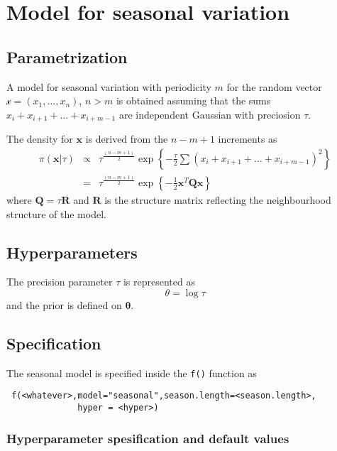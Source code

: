 \documentclass[a4paper,11pt]{article}
\begin{document}
\section*{Model for seasonal variation}

\subsection*{Parametrization}

A model for seasonal variation with periodicity $m$ for the random vector $\mathcal{x}=(x_1,\dots,x_n)$, $n>m$ is obtained assuming that the sums $x_i+x_{i+1}+\dots+x_{i+m-1}$ are independent Gaussian with preciosion $\tau$.

The density for $\mathbf{x}$ is derived from the $n-m+1$ increments as
\begin{eqnarray}
\pi(\mathbf{x}|\tau) &\propto& \tau^{\frac{(n-m+1)}{2}} \exp\left\{-\frac{\tau}{2}\sum (x_i+x_{i+1}+\dots+x_{i+m-1})^2\right\}\\
& = &\tau^{\frac{(n-m+1)}{2}}\exp\left\{-\frac{1}{2}\mathbf{x}^T\mathbf{Q}\mathbf{x} \right\}
\end{eqnarray}
where $\mathbf{Q}=\tau\mathbf{R}$ and $\mathbf{R}$ is the structure matrix reflecting the neighbourhood structure of the model.


\subsection*{Hyperparameters}

The precision parameter $\tau$ is represented as
\begin{displaymath}
    \theta =\log \tau
\end{displaymath}
and the prior is defined on $\mathbf{\theta}$. 

\subsection*{Specification}

The seasonal model is specified inside the {\tt f()} function as
\begin{verbatim}
 f(<whatever>,model="seasonal",season.length=<season.length>,
              hyper = <hyper>)
\end{verbatim}
 
\subsubsection*{Hyperparameter spesification and default values}

\end{document}
